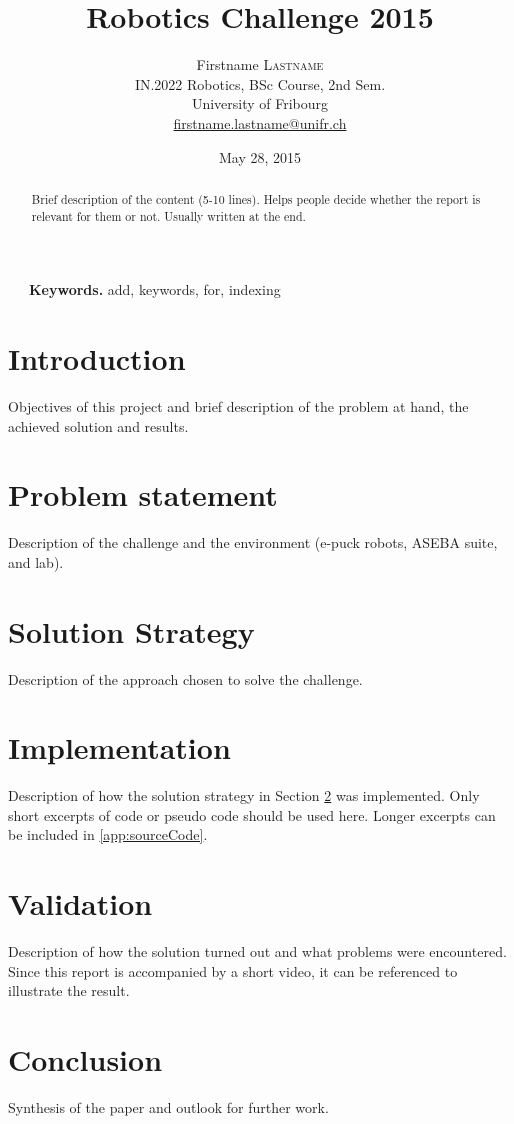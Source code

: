 \documentclass[12pt,a4paper]{article}
\title{Robotics Challenge 2015}
\date{May 28, 2015}
\author{
	Firstname \textsc{Lastname}\\
	IN.2022 Robotics, BSc Course, 2nd Sem.\\
	University of Fribourg \\
	\href{mailto:firstname.lastname@unifr.ch}{firstname.lastname@unifr.ch}
}
\begin{document}
\maketitle

\begin{abstract}
\noindent Brief description of the content (5-10 lines). Helps people decide whether the report is relevant for them or not. Usually written at the end.
\end{abstract}
~~~\indent \textbf{Keywords.} add, keywords, for, indexing

\section*{Introduction}
Objectives of this project and brief description of the problem at hand, the achieved solution and results.

\section{Problem statement}
Description of the challenge and the environment (e-puck robots, ASEBA suite, and lab).

\section{Solution Strategy} \label{sec:solStrategy}
Description of the approach chosen to solve the challenge.

\section{Implementation}
Description of how the solution strategy in Section \ref{sec:solStrategy} was implemented. Only short excerpts of code or pseudo code should be used here. Longer excerpts can be included in \ref{app:sourceCode}.

\section{Validation}
Description of how the solution turned out and what problems were encountered. Since this report is accompanied by a short video, it can be referenced to illustrate the result.

\section*{Conclusion}
Synthesis of the paper and outlook for further work.
\end{document}
